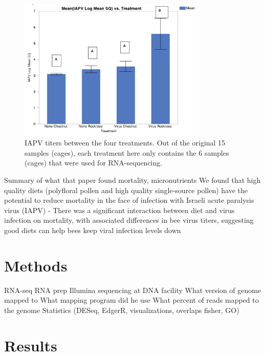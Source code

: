 \documentclass[11pt,a4paper,oldfontcommands,openany]{memoir}
\numberwithin{equation}{section} %
\begin{document}
\begin{figure}[H]
\centering
  \begin{framed}
  \includegraphics[width=0.8\textwidth]{Images/IAPVRNASeq}
  \end{framed}
  \caption{IAPV titers between the four treatments. Out of the original 15 samples (cages), each treatment here only contains the 6 samples (cages) that were used for RNA-sequencing.}
  \label{fig:IAPVRNASeq}
\end{figure}

Summary of what that paper found mortality, micronutrients
 We found that high quality diets (polyfloral pollen and high quality single-source pollen) have the potential to reduce mortality in the face of infection with Israeli acute paralysis virus (IAPV)
- There was a significant interaction between diet and virus infection on mortality, with associated differences in bee virus titers, suggesting good diets can help bees keep viral infection levels down





\section{Methods}





RNA-seq
RNA prep
Illumina sequencing at DNA facility
What version of genome mapped to
What mapping program did he use
What percent of reads mapped to the genome
Statistics (DESeq, EdgerR, visualizations, overlaps fisher, GO) 


\section{Results}
\end{document}
